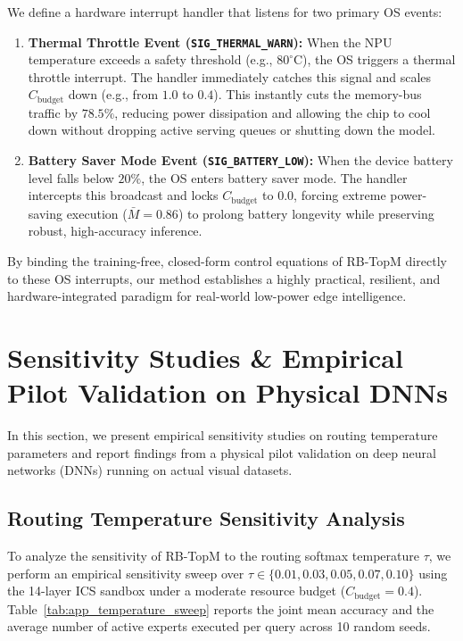 \documentclass{article}
\theoremstyle{plain}
\theoremstyle{definition}
\theoremstyle{remark}
\begin{document}
We define a hardware interrupt handler that listens for two primary OS events:
\begin{enumerate}
    \item \textbf{Thermal Throttle Event (\texttt{SIG\_THERMAL\_WARN}):} When the NPU temperature exceeds a safety threshold (e.g., $80^{\circ}\text{C}$), the OS triggers a thermal throttle interrupt. The handler immediately catches this signal and scales $C_{\text{budget}}$ down (e.g., from $1.0$ to $0.4$). This instantly cuts the memory-bus traffic by $78.5\%$, reducing power dissipation and allowing the chip to cool down without dropping active serving queues or shutting down the model.
    \item \textbf{Battery Saver Mode Event (\texttt{SIG\_BATTERY\_LOW}):} When the device battery level falls below $20\%$, the OS enters battery saver mode. The handler intercepts this broadcast and locks $C_{\text{budget}}$ to $0.0$, forcing extreme power-saving execution ($\bar{M}=0.86$) to prolong battery longevity while preserving robust, high-accuracy inference.
\end{enumerate}

By binding the training-free, closed-form control equations of RB-TopM directly to these OS interrupts, our method establishes a highly practical, resilient, and hardware-integrated paradigm for real-world low-power edge intelligence.

\section{Sensitivity Studies \& Empirical Pilot Validation on Physical DNNs}
\label{app:sensitivity_pilot}

In this section, we present empirical sensitivity studies on routing temperature parameters and report findings from a physical pilot validation on deep neural networks (DNNs) running on actual visual datasets.

\subsection{Routing Temperature Sensitivity Analysis}
To analyze the sensitivity of RB-TopM to the routing softmax temperature $\tau$, we perform an empirical sensitivity sweep over $\tau \in \{0.01, 0.03, 0.05, 0.07, 0.10\}$ using the 14-layer ICS sandbox under a moderate resource budget ($C_{\text{budget}} = 0.4$). Table~\ref{tab:app_temperature_sweep} reports the joint mean accuracy and the average number of active experts executed per query across 10 random seeds.
\end{document}
